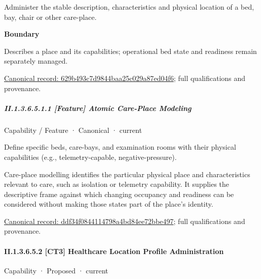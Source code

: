Administer the stable description, characteristics and physical location of a bed, bay, chair or other care-place.



\textbf{Boundary}



Describes a place and its capabilities; operational bed state and readiness remain separately managed.


{\footnotesize \href{../../../../continuum/strategy/capability/629b493c7d9844baa25c029a87ed04f6.md}{Canonical record: 629b493c7d9844baa25c029a87ed04f6}; full qualifications and provenance.}\par
\subparagraph*{II.1.3.6.5.1.1 [Feature] Atomic Care-Place Modeling}
\label{navigation:II.1.3.6.5.1.1}

\label{element:ddf34f0844114798a4bd84ee72bbe497}
{\small Capability / Feature · Canonical · current}\par

Define specific beds, care-bays, and examination rooms with their physical capabilities (e.g., telemetry-capable, negative-pressure).



Care-place modelling identifies the particular physical place and characteristics relevant to care, such as isolation or telemetry capability. It supplies the descriptive frame against which changing occupancy and readiness can be considered without making those states part of the place's identity.


{\footnotesize \href{../../../../continuum/strategy/capability/feature/ddf34f0844114798a4bd84ee72bbe497.md}{Canonical record: ddf34f0844114798a4bd84ee72bbe497}; full qualifications and provenance.}\par
\paragraph*{II.1.3.6.5.2 [CT3] Healthcare Location Profile Administration}
\label{navigation:II.1.3.6.5.2}

\label{element:e579e54a08bb4f899a504aa998ba246b}
{\small Capability · Proposed · current}\par

